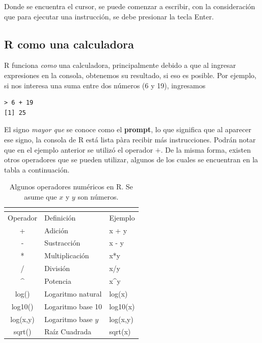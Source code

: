 \documentclass[letterpaper,11pt]{article}
\begin{document}
Donde se encuentra el cursor, se puede comenzar a escribir, con la consideración que para ejecutar una instrucción, se debe presionar la tecla Enter.

\subsection{R como una calculadora}

R funciona \emph{como} una calculadora, principalmente debido a que al ingresar expresiones en la consola, obtenemos su resultado, si eso es posible. Por ejemplo, si nos interesa una suma entre dos números (6 y 19), ingresamos

\begin{lstlisting}
> 6 + 19
[1] 25
\end{lstlisting}

El signo \emph{mayor que} se conoce como el {\bf prompt}, lo que significa que al aparecer ese signo, la consola de R está lista pàra recibir más instrucciones. Podrán notar que en el ejemplo anterior se utilizó el operador $+$. De la misma forma, existen otros operadores que se pueden utilizar, algunos de los cuales se encuentran en la tabla a continuación.

\begin{table}[H]
\centering
\caption{Algunos operadores numéricos en R. Se asume que $x$ y $y$ son números.}
\begin{tabular}{cll}
	\multicolumn{3}{c}{}\\
\hline \hline
Operador	& Definición & Ejemplo\\
\hline
+ & Adición & {\ttfamily x + y}\\
- & Sustracción & {\ttfamily x - y}\\
* & Multiplicación & {\ttfamily x*y}\\
/ & División & {\ttfamily x/y}\\
\textasciicircum & Potencia & {\ttfamily x\textasciicircum y} \\
log() & Logaritmo natural & {\ttfamily log(x)}\\
log10() & Logaritmo base 10 & {\ttfamily log10(x)}\\
log(x,y) & Logaritmo base $y$ & {\ttfamily log(x,y)}\\
sqrt() & Raíz Cuadrada & {\ttfamily sqrt(x)}\\

\hline 
\end{tabular}
\end{table}
\end{document}
